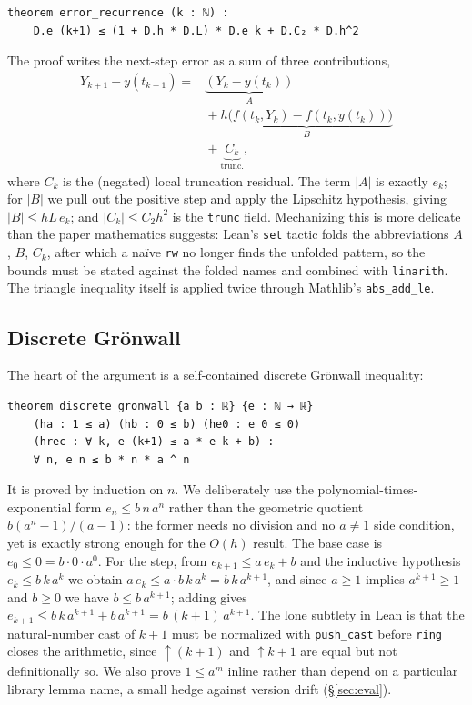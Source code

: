 \documentclass[sigplan,nonacm,screen]{acmart}
\begin{document}
\begin{lstlisting}[language=lean]
theorem error_recurrence (k : ℕ) :
    D.e (k+1) ≤ (1 + D.h * D.L) * D.e k + D.C₂ * D.h^2
\end{lstlisting}

The proof writes the next-step error as a sum of three contributions,
\[
\begin{aligned}
Y_{k+1} - y(t_{k+1}) = {}& \underbrace{(Y_k - y(t_k))}_{A}\\
  &{}+ \underbrace{h\big(f(t_k,Y_k) - f(t_k,y(t_k))\big)}_{B}\\
  &{}+ \underbrace{C_k}_{\text{trunc.}},
\end{aligned}
\]
where $C_k$ is the (negated) local truncation residual. The term $|A|$ is exactly
$e_k$; for $|B|$ we pull out the positive step and apply the Lipschitz hypothesis,
giving $|B| \le hL\,e_k$; and $|C_k| \le C_2 h^2$ is the \texttt{trunc} field.
Mechanizing this is more delicate than the paper mathematics suggests: Lean's
\lstinline[language=lean]|set| tactic folds the abbreviations $A$, $B$, $C_k$,
after which a na\"ive \lstinline[language=lean]|rw| no longer finds the unfolded
pattern, so the bounds must be stated against the folded names and combined with
\lstinline[language=lean]|linarith|. The triangle inequality itself is applied
twice through Mathlib's \lstinline[language=lean]|abs_add_le|.

\subsection{Discrete Grönwall}
The heart of the argument is a self-contained discrete Grönwall inequality:

\begin{lstlisting}[language=lean]
theorem discrete_gronwall {a b : ℝ} {e : ℕ → ℝ}
    (ha : 1 ≤ a) (hb : 0 ≤ b) (he0 : e 0 ≤ 0)
    (hrec : ∀ k, e (k+1) ≤ a * e k + b) :
    ∀ n, e n ≤ b * n * a ^ n
\end{lstlisting}

It is proved by induction on $n$. We deliberately use the
polynomial-times-exponential form $e_n \le b\,n\,a^n$ rather than the geometric
quotient $b(a^n - 1)/(a-1)$: the former needs no division and no $a \ne 1$ side
condition, yet is exactly strong enough for the $O(h)$ result. The base case is
$e_0 \le 0 = b\cdot 0\cdot a^0$. For the step, from
$e_{k+1} \le a\,e_k + b$ and the inductive hypothesis $e_k \le b\,k\,a^k$ we obtain
$a\,e_k \le a\cdot b\,k\,a^k = b\,k\,a^{k+1}$, and since $a \ge 1$ implies
$a^{k+1}\ge 1$ and $b \ge 0$ we have $b \le b\,a^{k+1}$; adding gives
$e_{k+1} \le b\,k\,a^{k+1} + b\,a^{k+1} = b\,(k+1)\,a^{k+1}$. The lone subtlety in
Lean is that the natural-number cast of $k+1$ must be normalized with
\lstinline[language=lean]|push_cast| before \lstinline[language=lean]|ring| closes
the arithmetic, since $\uparrow(k+1)$ and $\uparrow k + 1$ are equal but not
definitionally so. We also prove $1 \le a^m$ inline rather than depend on a
particular library lemma name, a small hedge against version drift
(\S\ref{sec:eval}).
\end{document}
